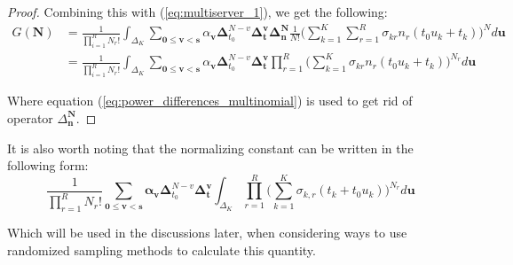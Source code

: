 \begin{proof}
    Combining this with (\ref{eq:multiserver_1}), we get the following:
    \begin{align}
        G(\mathbf{N}) & = \frac{1}{\prod_{i=1}^R N_r!} \int_{\Delta_K} \sum_{\mathbf{0 \leq v < s}} \alpha_{\mathbf{v}} \boldsymbol{\Delta}_{t_0}^{N-v} \boldsymbol{\Delta}_{\mathbf{t}}^{\mathbf{v}} \boldsymbol{\Delta}_{\mathbf{n}}^{\mathbf{N}} \frac{1}{N!} \bigg( \sum_{k=1}^K \sum_{r=1}^R \sigma_{kr} n_r (t_0 u_k + t_k) \bigg)^N d\mathbf{u} \\
        & = \frac{1}{\prod_{i=1}^R N_r!} \int_{\Delta_K} \sum_{\mathbf{0 \leq v < s}} \alpha_{\mathbf{v}} \boldsymbol{\Delta}_{t_0}^{N-v} \boldsymbol{\Delta}_{\mathbf{t}}^{\mathbf{v}} \prod_{r=1}^{R} \bigg( \sum_{k=1}^K \sigma_{kr} n_r (t_0 u_k + t_k) \bigg)^{N_r} d\mathbf{u}
    \end{align}
    
    Where equation (\ref{eq:power_differences_multinomial}) is used to get rid of operator \(\Delta_{\mathbf{n}}^{\mathbf{N}}\).
    
\end{proof}

It is also worth noting that the normalizing constant can be written in the following form:
\begin{equation}\label{eq:msint2}
    \frac{1}{\prod_{r=1}^R N_r!} \sum_{\mathbf{0 \leq v <s}} \mathbf{\alpha_v} \boldsymbol{\Delta}_{t_0}^{N-v} \boldsymbol{\Delta}_{\mathbf{t}}^{\mathbf{v}} \int_{\Delta_K}  \prod_{r=1}^R \bigg( \sum_{k=1}^K \sigma_{k,r}(t_k + t_0 u_k) \bigg)^{N_r} d\mathbf{u}
\end{equation}

Which will be used in the discussions later, when considering ways to use randomized sampling methods to calculate this quantity.
